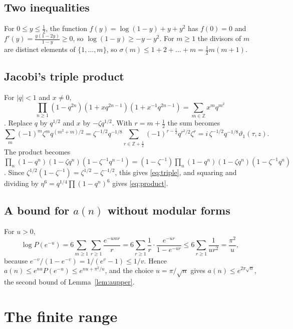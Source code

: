 \documentclass[11pt]{amsart}
\theoremstyle{definition}
\newcommand{\ZZ}{\mathbb{Z}}
\newcommand{\vt}{\vartheta}
\begin{document}
\subsection*{Two inequalities}
For $0\le y\le\frac12$, the function $f(y)=\log(1-y)+y+y^2$ has $f(0)=0$ and $f'(y)=\frac{y(1-2y)}{1-y}\ge0$, so $\log(1-y)\ge-y-y^2$. For $m\ge1$ the divisors of $m$ are distinct elements of $\{1,\dots,m\}$, so $\sigma(m)\le1+2+\dots+m=\frac12m(m+1)$.

\subsection*{Jacobi's triple product}
For $|q|<1$ and $x\ne0$,
\[
\prod_{n\ge1}(1-q^{2n})(1+xq^{2n-1})(1+x^{-1}q^{2n-1})=\sum_{m\in\ZZ}x^mq^{m^2}
\]
\cite[Thm.~2.8]{And84}. Replace $q$ by $q^{1/2}$ and $x$ by $-\zeta q^{1/2}$. With $r=m+\frac12$ the sum becomes
\[
\sum_m(-1)^m\zeta^mq^{(m^2+m)/2}=\zeta^{-1/2}q^{-1/8}\sum_{r\in\ZZ+\frac12}(-1)^{r-\frac12}q^{r^2/2}\zeta^r=i\,\zeta^{-1/2}q^{-1/8}\vt_1(\tau,z).
\] The product becomes $\prod_n(1-q^n)(1-\zeta q^n)(1-\zeta^{-1}q^{n-1})=(1-\zeta^{-1})\prod_n(1-q^n)(1-\zeta q^n)(1-\zeta^{-1}q^n)$. Since $\zeta^{1/2}(1-\zeta^{-1})=\zeta^{1/2}-\zeta^{-1/2}$, this gives \eqref{eq:triple}, and squaring and dividing by $\eta^6=q^{1/4}\prod(1-q^n)^6$ gives \eqref{eq:product}.

\subsection*{A bound for $a(n)$ without modular forms}
For $u>0$,
\[
\log P(e^{-u})=6\sum_{m\ge1}\sum_{r\ge1}\frac{e^{-umr}}{r}=6\sum_{r\ge1}\frac1r\cdot\frac{e^{-ur}}{1-e^{-ur}}\le6\sum_{r\ge1}\frac{1}{ur^2}=\frac{\pi^2}{u},
\]
because $e^{-v}/(1-e^{-v})=1/(e^v-1)\le1/v$. Hence $a(n)\le e^{nu}P(e^{-u})\le e^{nu+\pi^2/u}$, and the choice $u=\pi/\sqrt n$ gives $a(n)\le e^{2\pi\sqrt n}$, the second bound of Lemma~\ref{lem:aupper}.

\section{The finite range}\label{app:finite}
\end{document}
